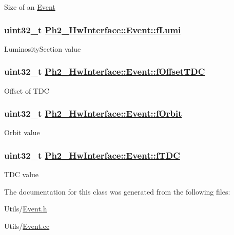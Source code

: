 Size of an \hyperlink{class_ph2___hw_interface_1_1_event}{Event} \hypertarget{class_ph2___hw_interface_1_1_event_78afd0886560acf70ee6b982c5690e0a}{
\subsubsection[fLumi]{\setlength{\rightskip}{0pt plus 5cm}uint32\_\-t \hyperlink{class_ph2___hw_interface_1_1_event_78afd0886560acf70ee6b982c5690e0a}{Ph2\_\-Hw\-Interface::Event::f\-Lumi}}}
\label{class_ph2___hw_interface_1_1_event_78afd0886560acf70ee6b982c5690e0a}


Luminosity\-Section value \hypertarget{class_ph2___hw_interface_1_1_event_fd3160b2830469808d9f671bfbedfd55}{
\subsubsection[fOffsetTDC]{\setlength{\rightskip}{0pt plus 5cm}uint32\_\-t \hyperlink{class_ph2___hw_interface_1_1_event_fd3160b2830469808d9f671bfbedfd55}{Ph2\_\-Hw\-Interface::Event::f\-Offset\-TDC}}}
\label{class_ph2___hw_interface_1_1_event_fd3160b2830469808d9f671bfbedfd55}


Offset of TDC \hypertarget{class_ph2___hw_interface_1_1_event_6aa6c402d2b16e735fbb4b7518c2666e}{
\subsubsection[fOrbit]{\setlength{\rightskip}{0pt plus 5cm}uint32\_\-t \hyperlink{class_ph2___hw_interface_1_1_event_6aa6c402d2b16e735fbb4b7518c2666e}{Ph2\_\-Hw\-Interface::Event::f\-Orbit}}}
\label{class_ph2___hw_interface_1_1_event_6aa6c402d2b16e735fbb4b7518c2666e}


Orbit value \hypertarget{class_ph2___hw_interface_1_1_event_b91638311238d12f1cd258556c8d1d80}{
\subsubsection[fTDC]{\setlength{\rightskip}{0pt plus 5cm}uint32\_\-t \hyperlink{class_ph2___hw_interface_1_1_event_b91638311238d12f1cd258556c8d1d80}{Ph2\_\-Hw\-Interface::Event::f\-TDC}}}
\label{class_ph2___hw_interface_1_1_event_b91638311238d12f1cd258556c8d1d80}


TDC value 

The documentation for this class was generated from the following files:\begin{CompactItemize}
\item 
Utils/\hyperlink{_event_8h}{Event.h}\item 
Utils/\hyperlink{_event_8cc}{Event.cc}\end{CompactItemize}
